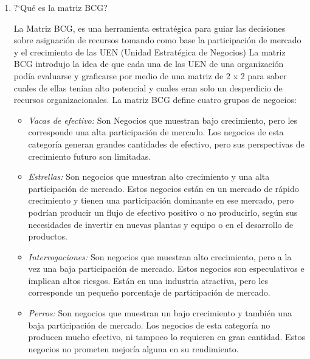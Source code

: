 \begin{enumerate}
\begin{itemize}
Los t\'opicos a abordar en este texto, estar\'an orientados principalmente hacia las estrategias a nivel corporativo y a nivel de negocios.
Este \'enfasis no debe restar importancia a las estrategias a nivel funcional; m\'as bien, es un reflejo de la importancia que los
investigadores y los profesionales han dado al desarrollo de marcos estrat\'egicos.
	\end{itemize}


	\item ?`Qu\'e es la matriz BCG?

	La Matriz BCG, es una herramienta estrat\'egica para guiar las decisiones sobre asignaci\'on de recursos tomando como base
	la participaci\'on de mercado y el crecimiento de las UEN (Unidad Estrat\'egica de Negocios)
	La matriz BCG introdujo la idea de que cada una de las UEN de una organizaci\'on pod\'ia evaluarse y graficarse por medio de
	una matriz de 2 x 2 para saber cuales de ellas ten\'ian alto potencial y cuales eran solo un desperdicio de recursos organizacionales.
        La matriz BCG define cuatro grupos de negocios:
	\begin{itemize}
		\item \emph{Vacas de efectivo:} Son Negocios que muestran bajo crecimiento, pero les corresponde una alta participaci\'on de mercado.
			Los negocios de esta categor\'ia generan grandes cantidades de efectivo, pero sus perspectivas de crecimiento futuro son limitadas.
		\item \emph{Estrellas:} Son negocios que muestran alto crecimiento y una alta participaci\'on de mercado. Estos negocios est\'an en un mercado
			de r\'apido crecimiento y tienen una participaci\'on dominante en ese mercado, pero podr\'ian producir un flujo de efectivo positivo o no
			producirlo, seg\'un sus necesidades de invertir en nuevas plantas y equipo o en el desarrollo de productos.
		\item \emph{Interrogaciones:} Son negocios que muestran alto crecimiento, pero a la vez una baja participaci\'on de mercado. Estos negocios
			son especulativos e implican altos riesgos. Est\'an en una industria atractiva, pero les corresponde un peque\~no porcentaje de
			participaci\'on de mercado.
		\item \emph{Perros:} Son negocios que muestran un bajo crecimiento y tambi\'en una baja participaci\'on de mercado. Los negocios de esta
			categor\'ia no producen mucho efectivo, ni tampoco lo requieren en gran cantidad. Estos negocios no prometen mejor\'ia alguna en
			su rendimiento.
	\end{itemize}


\end{enumerate}
